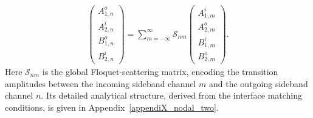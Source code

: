 \documentclass[aps,prb,onecolumn,longbibliography,nofootinbib,citeautoscript,10pt]{revtex4-2}
\begin{document}
\begin{align}
	\begin{pmatrix} 
		A_{1,n}^{o} \\ A_{2,n}^{i} \\ B_{1,n}^{o} \\ B_{2,n}^{i} 
	\end{pmatrix} 
	= \sum_{m=-\infty}^{\infty} \mathcal{S}_{nm} 
	\begin{pmatrix} 
		A_{1,m}^{i} \\ A_{2,m}^{o} \\ B_{1,m}^{i} \\ B_{2,m}^{o} 
	\end{pmatrix}.
	\label{eq:floquet_S_matriX_relation}
\end{align}
Here $\mathcal{S}_{nm}$ is the global Floquet-scattering matrix, encoding the transition amplitudes between the incoming sideband channel $m$ and the outgoing sideband channel $n$. Its detailed analytical structure, derived from the interface matching conditions, is given in Appendix~\ref{appendiX_nodal_two}.
\end{document}
